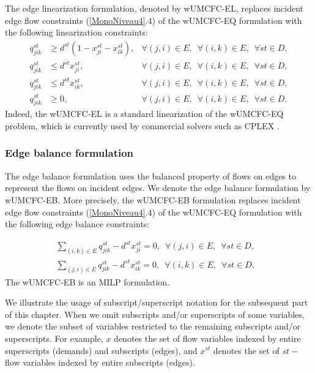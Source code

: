 The edge linearization formulation, denoted by wUMCFC-EL,  replaces incident edge flow constraints (\ref{MonoNiveau4}.4) of the wUMCFC-EQ formulation with the following linearization constraints:
\begin{align}
\label{linearcons}
    q^{st}_{jik}& \ge d^{st} (1 - x^{st}_{ji} - x^{st}_{ik}), &  \forall (j,i) \in E, \enspace \forall (i,k) \in E,\enspace \forall st \in D,\\
    q^{st}_{jik} &\le d^{st}  x^{st}_{ji}, & \forall (j,i) \in E, \enspace \forall (i,k) \in E,\enspace \forall st \in D,\\
   q^{st}_{jik} &\le d^{st}  x^{st}_{ik}, & \forall (j,i) \in E, \enspace \forall (i,k) \in E, \enspace\forall st \in D,\\
   q^{st}_{jik} & \ge 0, &  \forall (j,i) \in E, \enspace \forall (i,k) \in E,\enspace \forall st \in D.
\end{align}
Indeed, the wUMCFC-EL is a standard linearization of the wUMCFC-EQ problem, which is currently used by commercial solvers such as CPLEX \cite{bliek1u2014solving}.

\subsubsection{Edge balance formulation}

The edge balance formulation uses the balanced property of flows on edges to represent the flows on incident edges. We denote the edge balance formulation by wUMCFC-EB. More precisely, the wUMCFC-EB formulation replaces incident edge flow constraints (\ref{MonoNiveau4}.4) of the wUMCFC-EQ formulation with the following edge balance constraints:

\begin{equation}
\label{cons.adjedge}
\begin{split}
        \displaystyle\sum_{(i, k) \in E} q^{st}_{jik} - d^{st} x^{st}_{ji} = 0,  \enspace \forall (j,i) \in E, \enspace \forall st \in D,&\\
\displaystyle\sum_{(j, i) \in E} q^{st}_{jik} - d^{st} x^{st}_{ik} = 0,\enspace \forall (i,k) \in E,\enspace \forall st \in D.&
\end{split}
\end{equation}
The wUMCFC-EB is an MILP formulation.

We illustrate the usage of subscript/superscript notation for the subsequent part of this chapter. When we omit subscripts and/or superscripts of some variables, we denote the subset of variables restricted to the remaining subscripts and/or superscripts. For example, $x$ denotes the set of flow variables indexed by entire superscripts (demands) and subscripts (edges), and $x^{st}$ denotes the set of $st-$flow variables indexed by entire subscripts (edges).

